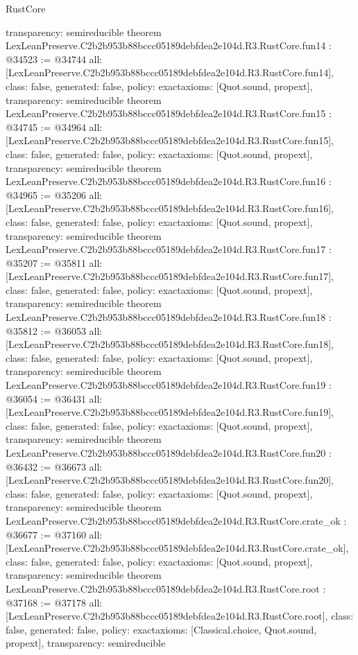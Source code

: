 \begin{lexlean}{RustCore}
\begin{coremodule}
{  transparency: semireducible
}
theorem LexLeanPreserve.C2b2b953b88bccc05189debfdea2e104d.R3.RustCore.fun14 : @34523 := @34744 {
  all: [LexLeanPreserve.C2b2b953b88bccc05189debfdea2e104d.R3.RustCore.fun14],
  class: false,
  generated: false,
  policy: exact{axioms: [Quot.sound, propext]},
  transparency: semireducible
}
theorem LexLeanPreserve.C2b2b953b88bccc05189debfdea2e104d.R3.RustCore.fun15 : @34745 := @34964 {
  all: [LexLeanPreserve.C2b2b953b88bccc05189debfdea2e104d.R3.RustCore.fun15],
  class: false,
  generated: false,
  policy: exact{axioms: [Quot.sound, propext]},
  transparency: semireducible
}
theorem LexLeanPreserve.C2b2b953b88bccc05189debfdea2e104d.R3.RustCore.fun16 : @34965 := @35206 {
  all: [LexLeanPreserve.C2b2b953b88bccc05189debfdea2e104d.R3.RustCore.fun16],
  class: false,
  generated: false,
  policy: exact{axioms: [Quot.sound, propext]},
  transparency: semireducible
}
theorem LexLeanPreserve.C2b2b953b88bccc05189debfdea2e104d.R3.RustCore.fun17 : @35207 := @35811 {
  all: [LexLeanPreserve.C2b2b953b88bccc05189debfdea2e104d.R3.RustCore.fun17],
  class: false,
  generated: false,
  policy: exact{axioms: [Quot.sound, propext]},
  transparency: semireducible
}
theorem LexLeanPreserve.C2b2b953b88bccc05189debfdea2e104d.R3.RustCore.fun18 : @35812 := @36053 {
  all: [LexLeanPreserve.C2b2b953b88bccc05189debfdea2e104d.R3.RustCore.fun18],
  class: false,
  generated: false,
  policy: exact{axioms: [Quot.sound, propext]},
  transparency: semireducible
}
theorem LexLeanPreserve.C2b2b953b88bccc05189debfdea2e104d.R3.RustCore.fun19 : @36054 := @36431 {
  all: [LexLeanPreserve.C2b2b953b88bccc05189debfdea2e104d.R3.RustCore.fun19],
  class: false,
  generated: false,
  policy: exact{axioms: [Quot.sound, propext]},
  transparency: semireducible
}
theorem LexLeanPreserve.C2b2b953b88bccc05189debfdea2e104d.R3.RustCore.fun20 : @36432 := @36673 {
  all: [LexLeanPreserve.C2b2b953b88bccc05189debfdea2e104d.R3.RustCore.fun20],
  class: false,
  generated: false,
  policy: exact{axioms: [Quot.sound, propext]},
  transparency: semireducible
}
theorem LexLeanPreserve.C2b2b953b88bccc05189debfdea2e104d.R3.RustCore.crate_ok : @36677 := @37160 {
  all: [LexLeanPreserve.C2b2b953b88bccc05189debfdea2e104d.R3.RustCore.crate_ok],
  class: false,
  generated: false,
  policy: exact{axioms: [Quot.sound, propext]},
  transparency: semireducible
}
theorem LexLeanPreserve.C2b2b953b88bccc05189debfdea2e104d.R3.RustCore.root : @37168 := @37178 {
  all: [LexLeanPreserve.C2b2b953b88bccc05189debfdea2e104d.R3.RustCore.root],
  class: false,
  generated: false,
  policy: exact{axioms: [Classical.choice, Quot.sound, propext]},
  transparency: semireducible
}


\end{coremodule}
\end{lexlean}
